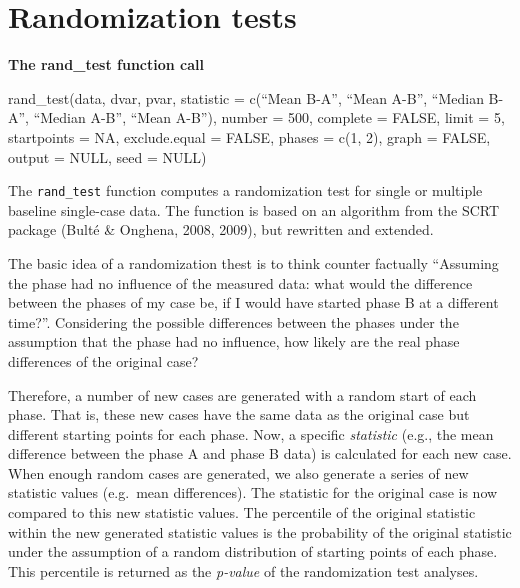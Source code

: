\documentclass[
  letterpaper,
  DIV=11,
  numbers=noendperiod]{scrreprt}
\begin{document}
\hypertarget{randomization-tests}{%
\chapter{Randomization tests}\label{randomization-tests}}

\begin{tcolorbox}[enhanced jigsaw, breakable, rightrule=.15mm, bottomrule=.15mm, arc=.35mm, colback=white, colframe=quarto-callout-tip-color-frame, opacityback=0, leftrule=.75mm, toprule=.15mm, left=2mm]
\begin{minipage}[t]{5.5mm}
\textcolor{quarto-callout-tip-color}{\faLightbulb}
\end{minipage}%
\begin{minipage}[t]{\textwidth - 5.5mm}

\textbf{The rand\_test function call}\vspace{2mm}

rand\_test(data, dvar, pvar, statistic = c(``Mean B-A'', ``Mean A-B'',
``Median B-A'', ``Median A-B'', ``Mean \textbar A-B\textbar{}''), number
= 500, complete = FALSE, limit = 5, startpoints = NA, exclude.equal =
FALSE, phases = c(1, 2), graph = FALSE, output = NULL, seed = NULL)

\end{minipage}%
\end{tcolorbox}

The \texttt{rand\_test} function computes a randomization test for
single or multiple baseline single-case data. The function is based on
an algorithm from the SCRT package (Bulté \& Onghena, 2008, 2009), but
rewritten and extended.

The basic idea of a randomization thest is to think counter factually
``Assuming the phase had no influence of the measured data: what would
the difference between the phases of my case be, if I would have started
phase B at a different time?''. Considering the possible differences
between the phases under the assumption that the phase had no influence,
how likely are the real phase differences of the original case?

Therefore, a number of new cases are generated with a random start of
each phase. That is, these new cases have the same data as the original
case but different starting points for each phase. Now, a specific
\emph{statistic} (e.g., the mean difference between the phase A and
phase B data) is calculated for each new case. When enough random cases
are generated, we also generate a series of new statistic values
(e.g.~mean differences). The statistic for the original case is now
compared to this new statistic values. The percentile of the original
statistic within the new generated statistic values is the probability
of the original statistic under the assumption of a random distribution
of starting points of each phase. This percentile is returned as the
\emph{p-value} of the randomization test analyses.
\end{document}
